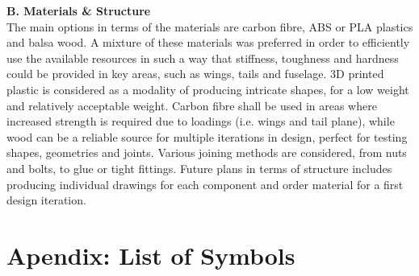 \documentclass[12pt]{article}
\begin{document}
\noindent \textbf{B. Materials \& Structure}\\
\noindent The main options in terms of the materials are carbon fibre, ABS or PLA plastics and balsa wood. A mixture of these materials was preferred in order to efficiently use the available resources in such a way that stiffness, toughness and hardness could be provided in key areas, such as wings, tails and fuselage. 3D printed plastic is considered as a modality of producing intricate shapes, for a low weight and relatively acceptable weight. Carbon fibre shall be used in areas where increased strength is required due to loadings (i.e. wings and tail plane), while wood can be a reliable source for multiple iterations in design, perfect for testing shapes, geometries and joints. Various joining methods are considered, from nuts and bolts, to glue or tight fittings. Future plans in terms of structure includes producing individual drawings for each component and order material for a first design iteration. 

\newpage

\appendix

\section{Apendix: List of Symbols}
\end{document}
